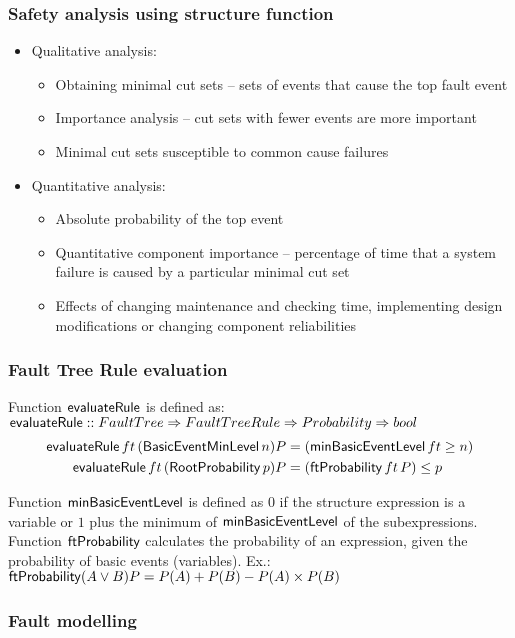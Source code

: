 \begin{frame}
\frametitle{Safety analysis using structure function}

\begin{itemize}
  \item Qualitative analysis:
    \begin{itemize}
      \item Obtaining minimal cut sets -- sets of events that cause the top fault event 
      \item Importance analysis -- cut sets with fewer events are more important
      \item Minimal cut sets susceptible to common cause failures
    \end{itemize}
  \item Quantitative analysis:
    \begin{itemize}
      \item Absolute probability of the top event 
      \item Quantitative component importance -- percentage of time that a system failure is caused by a particular minimal cut set
      \item Effects of changing maintenance and checking time, implementing design modifications or changing component reliabilities
    \end{itemize}
\end{itemize}
\end{frame}

\begin{frame}
\frametitle{Fault Tree Rule evaluation}


Function $\operatorname{\mathsf{evaluateRule}}$ is defined as:
$\operatorname{\mathsf{evaluateRule}} :: FaultTree \Rightarrow FaultTreeRule \Rightarrow Probability \Rightarrow bool$
{
\footnotesize 
\begin{subequations}
\begin{align}
\operatorname{\mathsf{evaluateRule}} ft \, (\operatorname{\mathsf{BasicEventMinLevel}} n) P &= (\operatorname{\mathsf{minBasicEventLevel}} ft \ge n)\\
\operatorname{\mathsf{evaluateRule}} ft \, (\operatorname{\mathsf{RootProbability}} p) P &= (\operatorname{\mathsf{ftProbability}} ft \, P) \le p
\end{align}
\end{subequations}
}

Function $\operatorname{\mathsf{minBasicEventLevel}}$ is defined as $0$ if the structure expression is a variable or $1$ plus the minimum of $\operatorname{\mathsf{minBasicEventLevel}}$ of the subexpressions.
%
Function $\operatorname{\mathsf{ftProbability}}$ calculates the probability of an expression, given the probability of basic events (variables). Ex.: $\operatorname{\mathsf{ftProbability}} (A \lor B) P = P(A) + P(B) - P(A) \times P(B)$
\end{frame}

\begin{frame}
\frametitle{Fault modelling}

\end{frame}